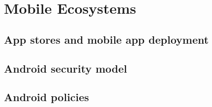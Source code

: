 \documentclass[thesis.tex]{subfiles}
\begin{document}
\chapter{Mobile Ecosystems}

\section{App stores and mobile app deployment}

\section{Android security model}

\section{Android policies}
\end{document}
